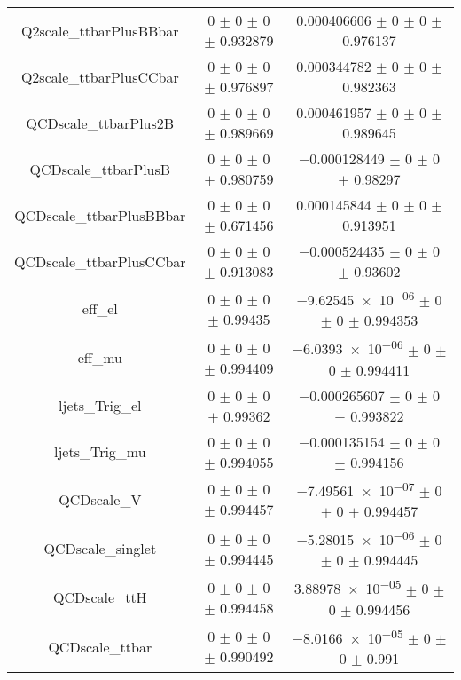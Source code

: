 \begin{table}
\begin{tabular}{ccc}
Q2scale\_ttbarPlusBBbar & \num{0} $\pm$ \num{0} $\pm$ \num{0} $\pm$ \num{0.932879} & \num{0.000406606} $\pm$ \num{0} $\pm$ \num{0} $\pm$ \num{0.976137}\\
Q2scale\_ttbarPlusCCbar & \num{0} $\pm$ \num{0} $\pm$ \num{0} $\pm$ \num{0.976897} & \num{0.000344782} $\pm$ \num{0} $\pm$ \num{0} $\pm$ \num{0.982363}\\
QCDscale\_ttbarPlus2B & \num{0} $\pm$ \num{0} $\pm$ \num{0} $\pm$ \num{0.989669} & \num{0.000461957} $\pm$ \num{0} $\pm$ \num{0} $\pm$ \num{0.989645}\\
QCDscale\_ttbarPlusB & \num{0} $\pm$ \num{0} $\pm$ \num{0} $\pm$ \num{0.980759} & \num{-0.000128449} $\pm$ \num{0} $\pm$ \num{0} $\pm$ \num{0.98297}\\
QCDscale\_ttbarPlusBBbar & \num{0} $\pm$ \num{0} $\pm$ \num{0} $\pm$ \num{0.671456} & \num{0.000145844} $\pm$ \num{0} $\pm$ \num{0} $\pm$ \num{0.913951}\\
QCDscale\_ttbarPlusCCbar & \num{0} $\pm$ \num{0} $\pm$ \num{0} $\pm$ \num{0.913083} & \num{-0.000524435} $\pm$ \num{0} $\pm$ \num{0} $\pm$ \num{0.93602}\\
eff\_el & \num{0} $\pm$ \num{0} $\pm$ \num{0} $\pm$ \num{0.99435} & \num{-9.62545e-06} $\pm$ \num{0} $\pm$ \num{0} $\pm$ \num{0.994353}\\
eff\_mu & \num{0} $\pm$ \num{0} $\pm$ \num{0} $\pm$ \num{0.994409} & \num{-6.0393e-06} $\pm$ \num{0} $\pm$ \num{0} $\pm$ \num{0.994411}\\
ljets\_Trig\_el & \num{0} $\pm$ \num{0} $\pm$ \num{0} $\pm$ \num{0.99362} & \num{-0.000265607} $\pm$ \num{0} $\pm$ \num{0} $\pm$ \num{0.993822}\\
ljets\_Trig\_mu & \num{0} $\pm$ \num{0} $\pm$ \num{0} $\pm$ \num{0.994055} & \num{-0.000135154} $\pm$ \num{0} $\pm$ \num{0} $\pm$ \num{0.994156}\\
QCDscale\_V & \num{0} $\pm$ \num{0} $\pm$ \num{0} $\pm$ \num{0.994457} & \num{-7.49561e-07} $\pm$ \num{0} $\pm$ \num{0} $\pm$ \num{0.994457}\\
QCDscale\_singlet & \num{0} $\pm$ \num{0} $\pm$ \num{0} $\pm$ \num{0.994445} & \num{-5.28015e-06} $\pm$ \num{0} $\pm$ \num{0} $\pm$ \num{0.994445}\\
QCDscale\_ttH & \num{0} $\pm$ \num{0} $\pm$ \num{0} $\pm$ \num{0.994458} & \num{3.88978e-05} $\pm$ \num{0} $\pm$ \num{0} $\pm$ \num{0.994456}\\
QCDscale\_ttbar & \num{0} $\pm$ \num{0} $\pm$ \num{0} $\pm$ \num{0.990492} & \num{-8.0166e-05} $\pm$ \num{0} $\pm$ \num{0} $\pm$ \num{0.991}\\

\end{tabular}
\end{table}
